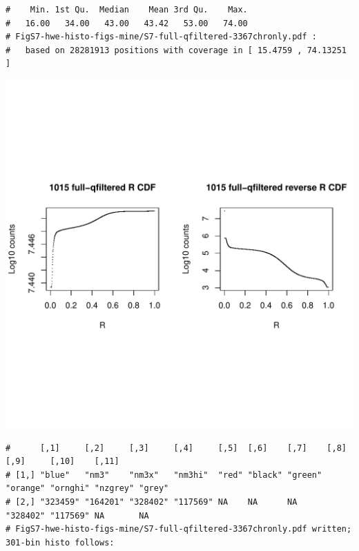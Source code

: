 \documentclass{article}\usepackage[]{graphicx}\usepackage[]{color}
\makeatletter
\def\maxwidth{ %
  \ifdim\Gin@nat@width>\linewidth
    \linewidth
  \else
    \Gin@nat@width
  \fi
}
\newenvironment{kframe}{%
 \def\at@end@of@kframe{}%
 \ifinner\ifhmode%
  \def\at@end@of@kframe{\end{minipage}}%
  \begin{minipage}{\columnwidth}%
 \fi\fi%
 \def\FrameCommand##1{\hskip\@totalleftmargin \hskip-\fboxsep
 \colorbox{shadecolor}{##1}\hskip-\fboxsep
     \hskip-\linewidth \hskip-\@totalleftmargin \hskip\columnwidth}%
 \MakeFramed {\advance\hsize-\width
   \@totalleftmargin\z@ \linewidth\hsize
   \@setminipage}}%
 {\par\unskip\endMakeFramed%
 \at@end@of@kframe}
\newenvironment{knitrout}{}{} %
\makeatother
\begin{document}
\begin{knitrout}
\begin{kframe}
\begin{verbatim}
#    Min. 1st Qu.  Median    Mean 3rd Qu.    Max. 
#   16.00   34.00   43.00   43.42   53.00   74.00 
# FigS7-hwe-histo-figs-mine/S7-full-qfiltered-3367chronly.pdf :
#   based on 28281913 positions with coverage in [ 15.4759 , 74.13251 ]
\end{verbatim}
\end{kframe}
\includegraphics[width=\maxwidth]{FigS7-hwe-histo-figs-knitr/unnamed-chunk-10-38} 
\begin{kframe}\begin{verbatim}
#      [,1]     [,2]     [,3]     [,4]     [,5]  [,6]    [,7]    [,8]     [,9]     [,10]    [,11] 
# [1,] "blue"   "nm3"    "nm3x"   "nm3hi"  "red" "black" "green" "orange" "ornghi" "nzgrey" "grey"
# [2,] "323459" "164201" "328402" "117569" NA    NA      NA      "328402" "117569" NA       NA    
# FigS7-hwe-histo-figs-mine/S7-full-qfiltered-3367chronly.pdf written; 301-bin histo follows:
\end{verbatim}
\end{kframe}

\end{knitrout}
\end{document}
